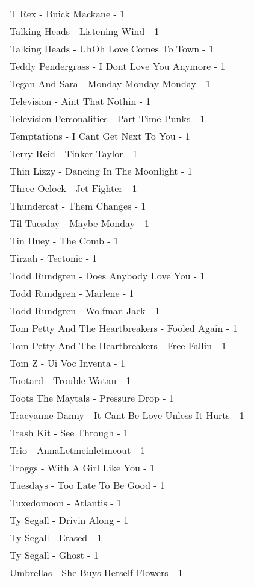 \documentclass[
]{article}
\begin{document}
\begin{longtable}{l}
T Rex - Buick Mackane - 1 \\ 
Talking Heads - Listening Wind - 1 \\ 
Talking Heads - UhOh Love Comes To Town - 1 \\ 
Teddy Pendergrass - I Dont Love You Anymore - 1 \\ 
Tegan And Sara - Monday Monday Monday - 1 \\ 
Television - Aint That Nothin - 1 \\ 
Television Personalities - Part Time Punks - 1 \\ 
Temptations - I Cant Get Next To You - 1 \\ 
Terry Reid - Tinker Taylor - 1 \\ 
Thin Lizzy - Dancing In The Moonlight - 1 \\ 
Three Oclock - Jet Fighter - 1 \\ 
Thundercat - Them Changes - 1 \\ 
Til Tuesday - Maybe Monday - 1 \\ 
Tin Huey - The Comb - 1 \\ 
Tirzah - Tectonic - 1 \\ 
Todd Rundgren - Does Anybody Love You - 1 \\ 
Todd Rundgren - Marlene - 1 \\ 
Todd Rundgren - Wolfman Jack - 1 \\ 
Tom Petty And The Heartbreakers - Fooled Again - 1 \\ 
Tom Petty And The Heartbreakers - Free Fallin - 1 \\ 
Tom Z - Ui Voc Inventa - 1 \\ 
Tootard - Trouble Watan - 1 \\ 
Toots The Maytals - Pressure Drop - 1 \\ 
Tracyanne Danny - It Cant Be Love Unless It Hurts - 1 \\ 
Trash Kit - See Through - 1 \\ 
Trio - AnnaLetmeinletmeout - 1 \\ 
Troggs - With A Girl Like You - 1 \\ 
Tuesdays - Too Late To Be Good - 1 \\ 
Tuxedomoon - Atlantis - 1 \\ 
Ty Segall - Drivin Along - 1 \\ 
Ty Segall - Erased - 1 \\ 
Ty Segall - Ghost - 1 \\ 
Umbrellas - She Buys Herself Flowers - 1 \\ 

\end{longtable}
\end{document}
